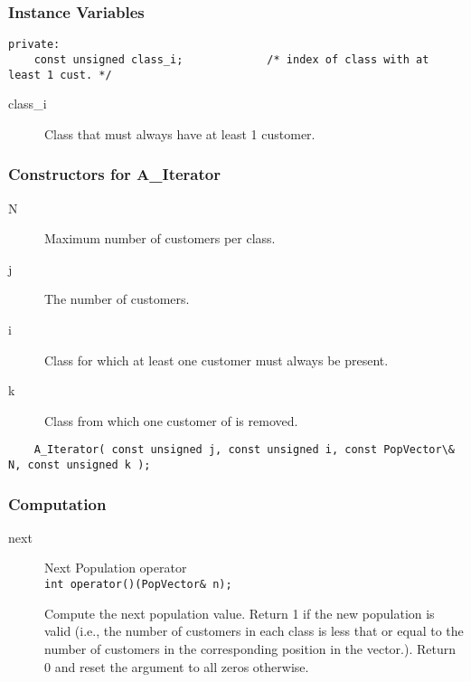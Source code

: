 \subsubsection{Instance Variables}
\label{sec:pop-AIter-ivars}

\begin{verbatim}
private:
    const unsigned class_i;             /* index of class with at least 1 cust. */
\end{verbatim}

\begin{description}
\item[class\_i] \texonly{---} Class that must always have at least 1 customer.
\end{description}

\subsubsection{Constructors for A\_Iterator}

\begin{description}
\item[N] \texonly{---} Maximum number of customers per class.
\item[j] \texonly{---} The number of customers.
\item[i] \texonly{---} Class for which at least one customer must
  always be present.
\item[k] \texonly{---} Class from which one customer of  is removed.

\end{description}

\begin{verbatim}
    A_Iterator( const unsigned j, const unsigned i, const PopVector\& N, const unsigned k );
\end{verbatim}

\subsubsection{Computation}

\begin{description}
\item[next] \texonly{---} Next Population operator\\
  \texttt{int operator()(PopVector\& n);}

  Compute the next population value.  Return 1 if the new population is
  valid (i.e., the number of customers in each class is less that or
  equal to the number of customers in the corresponding position in the
   vector.).  Return 0 and reset the argument  to all
  zeros otherwise.
\end{description}


